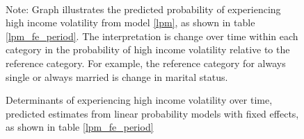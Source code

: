 \documentclass[12pt]{article}
\begin{document}
\begin{figure}[htp!]
    \centering
    \caption{Determinants of experiencing high income volatility over time, predicted estimates from linear probability models with fixed effects, as shown in table \ref{lpm_fe_period}}
    \label{pr_high_vol}
    \\
    \raggedright{\footnotesize{Note: Graph illustrates the predicted probability of experiencing high income volatility from model \ref{lpm}, as shown in table \ref{lpm_fe_period}.  The interpretation is change over time within each category in the probability of high income volatility relative to the reference category.  For example, the reference category for always single or always married is change in marital status.}}
\end{figure}
\end{document}
